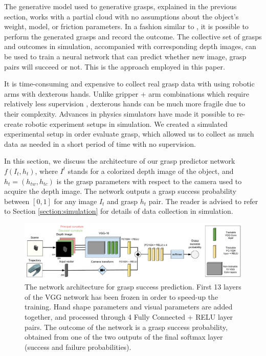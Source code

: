 The generative model used to generative grasps, explained in the previous section, works with a partial cloud with no assumptions about the object's weight, model, or friction parameters. In a fashion similar to \cite{Levine1}, it is possible to perform the generated grasps and record the outcome. The collective set of grasps and outcomes in simulation, accompanied with corresponding depth images, can be used to train a neural network that can predict whether new image, grasp pairs will succeed or not. This is the approach employed in this paper. 

It is time-consuming and expensive to collect real grasp data with using robotic arms with dexterous hands. Unlike gripper + arm combinations which require relatively less supervision \cite{Levine1}, dexterous hands can be much more fragile due to their complexity. Advances in physics simulators have made it possible to re-create robotic experiment setups in simulation. We created a simulated experimental setup in order evaluate grasp, which allowed us to collect as much data as needed in a short period of time with no supervision.

In this section, we discuss the architecture of our grasp predictor network $f(I_t, h_t)$, where $I^t$ stands for a colorized depth image of the object, and $h_t = (h_{tw}, h_{tc})$ is the grasp parameters with respect to the camera used to acquire the depth image. The network outputs a grasp success probability between $[0,1]$ for any image $I_t$ and grasp $h_t$ pair. The reader is advised to refer to Section \ref{section:simulation} for details of data collection in simulation.

\begin{figure}[ht]
  \includegraphics[width=\textwidth]{images/networkArchitecture.pdf}
  \caption{The network architecture for grasp success prediction. First 13 layers of the VGG network has been frozen in order to speed-up the training. Hand shape parameters and visual parameters are added together, and processed through 4 Fully Connected + RELU layer pairs. The outcome of the network is a grasp success probability, obtained from one of the two outputs of the final softmax layer (success and failure probabilities).}
\label{fig:networkArchitecture}
\end{figure}

